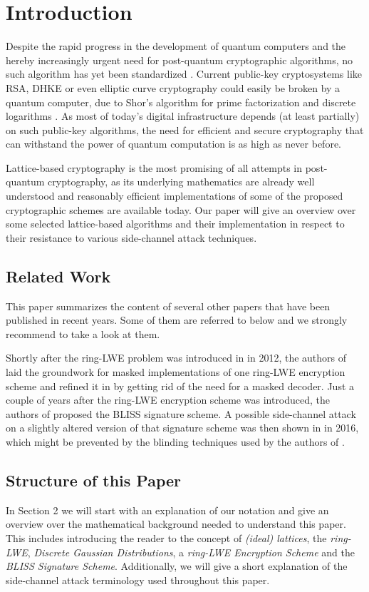 \chapter{Introduction}
Despite the rapid progress in the development of quantum computers and the hereby increasingly urgent need for post-quantum cryptographic algorithms, no such algorithm has yet been standardized \cite{Nist}. Current public-key cryptosystems like RSA, DHKE or even elliptic curve cryptography could easily be broken by a quantum computer, due to Shor's algorithm for prime factorization and discrete logarithms \cite{Shor}. As most of today's digital infrastructure depends (at least partially) on such public-key algorithms, the need for efficient and secure cryptography that can withstand the power of quantum computation is as high as never before.

Lattice-based cryptography is the most promising of all attempts in post-quantum cryptography, as its underlying mathematics are already well understood and reasonably efficient implementations of some of the proposed cryptographic schemes are available today. Our paper will give an overview over some selected lattice-based algorithms and their implementation in respect to their resistance to various side-channel attack techniques.

\section{Related Work}
This paper summarizes the content of several other papers that have been published in recent years. Some of them are referred to below and we strongly recommend to take a look at them.

Shortly after the \acs{ring-LWE} problem was introduced in \cite{cryptoeprint:2012:230} in 2012, the authors of \cite{maskedRing} laid the groundwork for masked implementations of one \acs{ring-LWE} encryption scheme and refined it in \cite{Reparaz2016} by getting rid of the need for a masked decoder. Just a couple of years after the \acs{ring-LWE} encryption scheme was introduced, the authors of \cite{bliss} proposed the BLISS signature scheme. A possible side-channel attack on a slightly altered version of that signature scheme was then shown in \cite{cryptoeprint:2016:300} in 2016, which might be prevented by the blinding techniques used by the authors of \cite{cryptoeprint:2016:276}.

\section{Structure of this Paper}
In Section 2 we will start with an explanation of our notation and give an overview over the mathematical background needed to understand this paper. This includes introducing the reader to the concept of \textit{(ideal) lattices}, the \textit{\ac{ring-LWE}}, \textit{Discrete Gaussian Distributions}, a \textit{\ac{ring-LWE} Encryption Scheme} and the \textit{BLISS Signature Scheme}. Additionally, we will give a short explanation of the side-channel attack terminology used throughout this paper.

